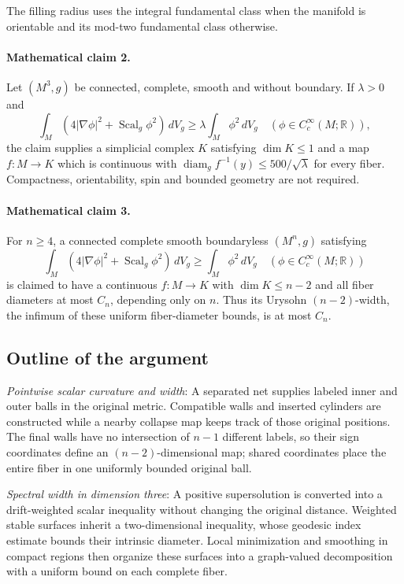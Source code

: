 \documentclass[11pt]{article}
\begin{document}
 The filling radius uses the integral fundamental class when the manifold is orientable and its mod-two fundamental class otherwise.

\paragraph{Mathematical claim 2.} Let $(M^3,g)$ be connected, complete, smooth and without boundary. If $\lambda>0$ and \[\int_M(4|\nabla\phi|^2+\operatorname{Scal}_g\phi^2)\,dV_g\ge\lambda\int_M\phi^2\,dV_g\quad(\phi\in C_c^\infty(M;\mathbb R)),\] the claim supplies a simplicial complex $K$ satisfying $\dim K\le1$ and a map $f:M\to K$ which is continuous with $\operatorname{diam}_g f^{-1}(y)\le500/\sqrt\lambda$ for every fiber. Compactness, orientability, spin and bounded geometry are not required.

\paragraph{Mathematical claim 3.} For $n\ge4$, a connected complete smooth boundaryless $(M^n,g)$ satisfying \[\int_M(4|\nabla\phi|^2+\operatorname{Scal}_g\phi^2)\,dV_g\ge\int_M\phi^2\,dV_g\quad(\phi\in C_c^\infty(M;\mathbb R))\] is claimed to have a continuous $f:M\to K$ with $\dim K\le n-2$ and all fiber diameters at most $C_n$, depending only on $n$. Thus its Urysohn $(n-2)$-width, the infimum of these uniform fiber-diameter bounds, is at most $C_n$.

\subsection{Outline of the argument}
\textit{Pointwise scalar curvature and width}: A separated net supplies labeled inner and outer balls in the original metric. Compatible walls and inserted cylinders are constructed while a nearby collapse map keeps track of those original positions. The final walls have no intersection of $n-1$ different labels, so their sign coordinates define an $(n-2)$-dimensional map; shared coordinates place the entire fiber in one uniformly bounded original ball.

\textit{Spectral width in dimension three}: A positive supersolution is converted into a drift-weighted scalar inequality without changing the original distance. Weighted stable surfaces inherit a two-dimensional inequality, whose geodesic index estimate bounds their intrinsic diameter. Local minimization and smoothing in compact regions then organize these surfaces into a graph-valued decomposition with a uniform bound on each complete fiber.
\end{document}
